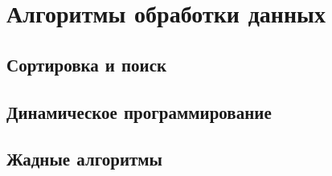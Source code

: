\chapter{Алгоритмы обработки данных}

\section{Сортировка и поиск}

\section{Динамическое программирование}

\section{Жадные алгоритмы}
